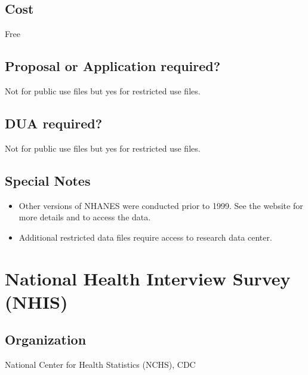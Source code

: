 \documentclass[
]{book}
\providecommand{\tightlist}{%
  \setlength{\itemsep}{0pt}\setlength{\parskip}{0pt}}
\begin{document}
\hypertarget{cost-49}{%
\section{Cost}\label{cost-49}}

Free

\hypertarget{proposal-or-application-required-49}{%
\section{Proposal or Application required?}\label{proposal-or-application-required-49}}

Not for public use files but yes for restricted use files.

\hypertarget{dua-required-49}{%
\section{DUA required?}\label{dua-required-49}}

Not for public use files but yes for restricted use files.

\hypertarget{special-notes-49}{%
\section{Special Notes}\label{special-notes-49}}

\begin{itemize}
\tightlist
\item
  Other versions of NHANES were conducted prior to 1999. See the website for more details and to access the data.
\item
  Additional restricted data files require access to research data center.
\end{itemize}

\mainmatter

\hypertarget{national-health-interview-survey-nhis}{%
\chapter{National Health Interview Survey (NHIS)}\label{national-health-interview-survey-nhis}}

\hypertarget{organization-50}{%
\section{Organization}\label{organization-50}}

National Center for Health Statistics (NCHS), CDC
\end{document}
